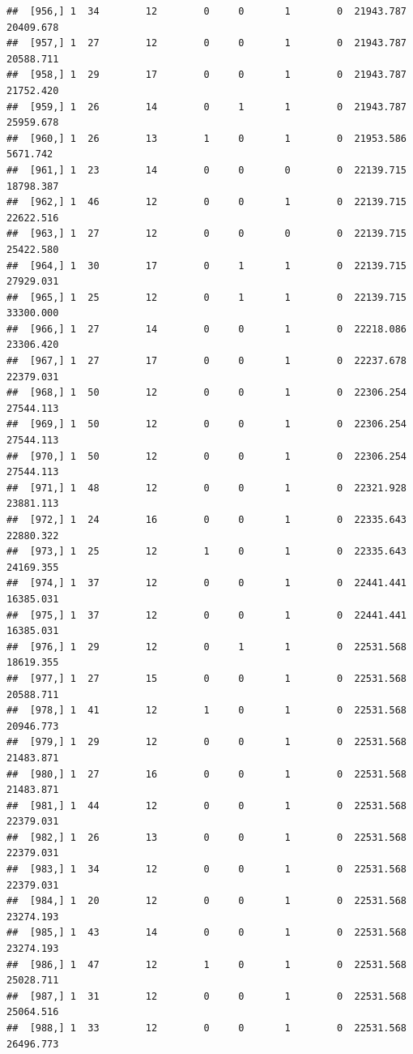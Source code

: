 \documentclass[
]{article}
\begin{document}
\begin{verbatim}
##  [956,] 1  34        12        0     0       1        0  21943.787  20409.678
##  [957,] 1  27        12        0     0       1        0  21943.787  20588.711
##  [958,] 1  29        17        0     0       1        0  21943.787  21752.420
##  [959,] 1  26        14        0     1       1        0  21943.787  25959.678
##  [960,] 1  26        13        1     0       1        0  21953.586   5671.742
##  [961,] 1  23        14        0     0       0        0  22139.715  18798.387
##  [962,] 1  46        12        0     0       1        0  22139.715  22622.516
##  [963,] 1  27        12        0     0       0        0  22139.715  25422.580
##  [964,] 1  30        17        0     1       1        0  22139.715  27929.031
##  [965,] 1  25        12        0     1       1        0  22139.715  33300.000
##  [966,] 1  27        14        0     0       1        0  22218.086  23306.420
##  [967,] 1  27        17        0     0       1        0  22237.678  22379.031
##  [968,] 1  50        12        0     0       1        0  22306.254  27544.113
##  [969,] 1  50        12        0     0       1        0  22306.254  27544.113
##  [970,] 1  50        12        0     0       1        0  22306.254  27544.113
##  [971,] 1  48        12        0     0       1        0  22321.928  23881.113
##  [972,] 1  24        16        0     0       1        0  22335.643  22880.322
##  [973,] 1  25        12        1     0       1        0  22335.643  24169.355
##  [974,] 1  37        12        0     0       1        0  22441.441  16385.031
##  [975,] 1  37        12        0     0       1        0  22441.441  16385.031
##  [976,] 1  29        12        0     1       1        0  22531.568  18619.355
##  [977,] 1  27        15        0     0       1        0  22531.568  20588.711
##  [978,] 1  41        12        1     0       1        0  22531.568  20946.773
##  [979,] 1  29        12        0     0       1        0  22531.568  21483.871
##  [980,] 1  27        16        0     0       1        0  22531.568  21483.871
##  [981,] 1  44        12        0     0       1        0  22531.568  22379.031
##  [982,] 1  26        13        0     0       1        0  22531.568  22379.031
##  [983,] 1  34        12        0     0       1        0  22531.568  22379.031
##  [984,] 1  20        12        0     0       1        0  22531.568  23274.193
##  [985,] 1  43        14        0     0       1        0  22531.568  23274.193
##  [986,] 1  47        12        1     0       1        0  22531.568  25028.711
##  [987,] 1  31        12        0     0       1        0  22531.568  25064.516
##  [988,] 1  33        12        0     0       1        0  22531.568  26496.773

\end{verbatim}
\end{document}
